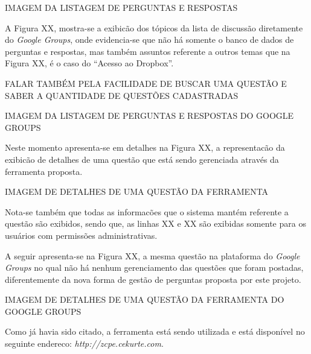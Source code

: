 IMAGEM DA LISTAGEM DE PERGUNTAS E RESPOSTAS

A Figura XX, mostra-se a exibicão dos tópicos da lista de discussão diretamente
do \textit{Google Groups}, onde evidencia-se que não há somente o banco de dados
de perguntas e respostas, mas também assuntos referente a outros temas que na
Figura XX, é o caso do ``Acesso ao Dropbox''.

FALAR TAMBÉM PELA FACILIDADE DE BUSCAR UMA QUESTÃO E SABER A QUANTIDADE DE
QUESTÕES CADASTRADAS

IMAGEM DA LISTAGEM DE PERGUNTAS E RESPOSTAS DO GOOGLE GROUPS

Neste momento apresenta-se em detalhes na Figura XX, a representacão da exibicão
de detalhes de uma questão que está sendo gerenciada através da ferramenta
proposta.

IMAGEM DE DETALHES DE UMA QUESTÃO DA FERRAMENTA

Nota-se também que todas as informacões que o sistema mantém referente a questão
são exibidos, sendo que, as linhas XX e XX são exibidas somente para os usuários
com permissões administrativas.

A seguir apresenta-se na Figura XX, a mesma questão na plataforma do
\textit{Google Groups} no qual não há nenhum gerenciamento das questões que
foram postadas, diferentemente da nova forma de gestão de perguntas proposta por
este projeto.

IMAGEM DE DETALHES DE UMA QUESTÃO DA FERRAMENTA DO GOOGLE GROUPS

Como já havia sido citado, a ferramenta está sendo utilizada e está disponível
no seguinte endereco: \textit{http://zcpe.cekurte.com}.
